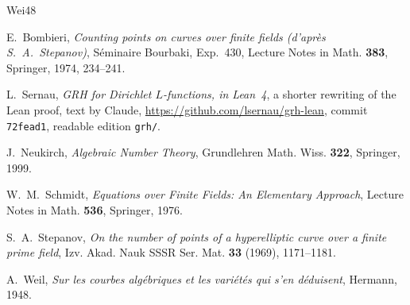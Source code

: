 \documentclass[reqno]{amsart}
\theoremstyle{definition}
\theoremstyle{plain}
\begin{document}
\begin{thebibliography}{Wei48}

E.~Bombieri, \emph{Counting points on curves over finite fields (d'apr\`es S.~A.~Stepanov)}, S\'eminaire Bourbaki, Exp.~430, Lecture Notes in Math. \textbf{383}, Springer, 1974, 234--241.

 L.~Sernau, \emph{GRH for Dirichlet \(L\)-functions, in Lean~4}, a shorter rewriting of the Lean proof, text by Claude, \url{https://github.com/lsernau/grh-lean}, commit \texttt{72fead1}, readable edition \texttt{grh/}.

J.~Neukirch, \emph{Algebraic Number Theory}, Grundlehren Math. Wiss. \textbf{322}, Springer, 1999.

W.~M.~Schmidt, \emph{Equations over Finite Fields: An Elementary Approach}, Lecture Notes in Math. \textbf{536}, Springer, 1976.

S.~A.~Stepanov, \emph{On the number of points of a hyperelliptic curve over a finite prime field}, Izv. Akad. Nauk SSSR Ser. Mat. \textbf{33} (1969), 1171--1181.

A.~Weil, \emph{Sur les courbes alg\'ebriques et les vari\'et\'es qui s'en d\'eduisent}, Hermann, 1948.

\end{thebibliography}
\end{document}
